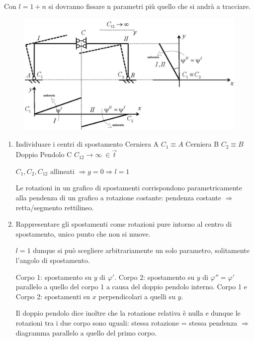 \documentclass{article}
\begin{document}
\begin{adjustwidth}{2in}{}
Con $l = 1+n$ si dovranno fissare n parametri più quello che si andrà a tracciare.
\begin{figure}[H]
	\centering
	\includegraphics[width=0.65\linewidth]{immagini/1.PARTE3_Pagina_18}
\end{figure}
\begin{enumerate}
\item Individuare i centri di spostamento \newline
Cerniera A $C_1 \equiv A$ \newline
Cerniera B $C_2 \equiv B$ \newline
Doppio Pendolo C $C_{12} \rightarrow \infty ~ \in \vec{t}$\newline

$C_1, C_2, C_{12}$ allineati $\Rightarrow g = 0 \Rightarrow l = 1$ \newline 

Le rotazioni in un grafico di spostamenti corrispondono parametricamente alla pendenza di un grafico a rotazione costante: pendenza costante $\Rightarrow$ retta/segmento rettilineo.

\item Rappresentare gli spostamenti come rotazioni pure intorno al centro di spostamento, unico punto che non si muove. 

$l =1$ dunque si può scegliere arbitrariamente un solo parametro, solitamente l'angolo di spostamento.

Corpo 1: spostamento su $ y $ di $\varphi'$. \newline
Corpo 2: spostamento su $ y $ di $\varphi'' = \varphi'$ parallelo a quello del corpo 1 a causa del doppio pendolo interno. \newline
Corpo 1 e Corpo 2: spostamenti su $ x $ perpendicolari a quelli su $ y $. \newline

Il doppio pendolo dice inoltre che la rotazione relativa è nulla e dunque le rotazioni tra i due corpo sono uguali: stessa rotazione = stessa pendenza $\Rightarrow$ diagramma parallelo a quello del primo corpo. 
\end{enumerate}


\end{adjustwidth}
\end{document}
